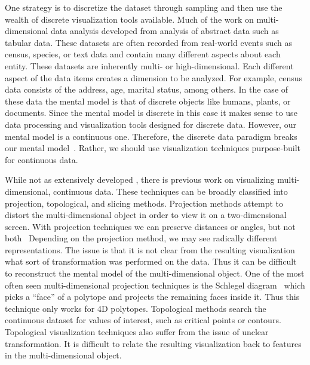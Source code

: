 One strategy is to discretize the dataset through sampling and then use the
wealth of discrete visualization tools available. Much of the work on
multi-dimensional data analysis developed from analysis of abstract data such
as tabular data. These datasets are often recorded from real-world
events such as census, species, or text data and contain many different aspects
about each entity. These datasets are inherently multi- or high-dimensional.
Each different aspect of the data items creates a dimension to be analyzed. For
example, census data consists of the address, age, marital status, among
others. In the case of these data the mental model is that of discrete objects
like humans, plants, or documents. Since the mental model is discrete in this
case it makes sense to use data processing and visualization tools designed for
discrete data.  However, our mental model is a continuous one. Therefore, the
discrete data paradigm breaks our mental model~\cite{Tory:2004a}. Rather, we
should use visualization techniques purpose-built for continuous data.


While not as extensively developed , there is previous
work on visualizing multi-dimensional, continuous data. These techniques can be
broadly classified into projection, topological, and slicing methods.
 Projection methods attempt to distort the multi-dimensional object
in order to view it on a two-dimensional screen. With projection techniques we
can preserve distances or angles, but not both~\cite{projection issues from
projecting the globe} Depending on the projection method, we may see radically
different representations.  The issue is that it is not clear from the
resulting visualization what sort of transformation was performed on the data.
Thus it can be difficult to reconstruct the mental model of the
multi-dimensional object.  One of the most often seen multi-dimensional
projection techniques is the Schlegel diagram~\cite{schlegel} which picks a
``face'' of a polytope and projects the remaining faces inside it. Thus this
technique only works for 4D polytopes.  Topological methods search the
continuous dataset for values of interest, such as critical points or contours. 
Topological visualization techniques also suffer from the issue of unclear
transformation. It is difficult to relate the resulting visualization back to
features in the multi-dimensional object.

